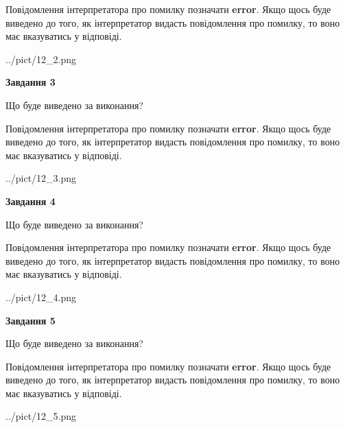 \documentclass[12pt, ukrainian]{article}
\begin{document}
{\begin {large}
Повідомлення інтерпретатора про помилку позначати \textbf{error}.
Якщо щось буде виведено до того, як інтерпретатор видасть повідомлення про помилку, 
то воно має вказуватись у відповіді. \par


\begin{center}
	{../pict/12_2.png}
\end{center}
\newpage

{\begin {center}\textbf{Завдання 3}\end {center}}\par
Що буде виведено за виконання?

Повідомлення інтерпретатора про помилку позначати \textbf{error}.
Якщо щось буде виведено до того, як інтерпретатор видасть повідомлення про помилку, 
то воно має вказуватись у відповіді. \par


\begin{center}
	{../pict/12_3.png}
\end{center}
\newpage

{\begin {center}\textbf{Завдання 4}\end {center}}\par
Що буде виведено за виконання?

Повідомлення інтерпретатора про помилку позначати \textbf{error}.
Якщо щось буде виведено до того, як інтерпретатор видасть повідомлення про помилку, 
то воно має вказуватись у відповіді. \par


\begin{center}
	{../pict/12_4.png}
\end{center}
\newpage

{\begin {center}\textbf{Завдання 5}\end {center}}\par
Що буде виведено за виконання?

Повідомлення інтерпретатора про помилку позначати \textbf{error}.
Якщо щось буде виведено до того, як інтерпретатор видасть повідомлення про помилку, 
то воно має вказуватись у відповіді. \par


\begin{center}
	{../pict/12_5.png}
\end{center}
\newpage


\end{large}}
\end{document}
